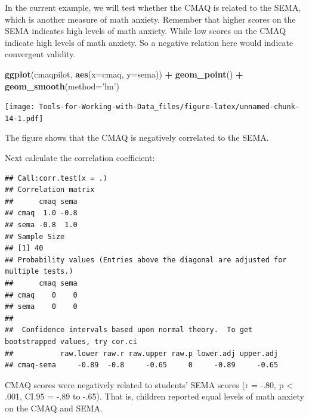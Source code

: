 \documentclass[
]{book}
\newenvironment{Shaded}{\begin{snugshade}}{\end{snugshade}}
\newcommand{\DataTypeTok}[1]{\textcolor[rgb]{0.13,0.29,0.53}{#1}}
\newcommand{\KeywordTok}[1]{\textcolor[rgb]{0.13,0.29,0.53}{\textbf{#1}}}
\newcommand{\NormalTok}[1]{#1}
\newcommand{\OperatorTok}[1]{\textcolor[rgb]{0.81,0.36,0.00}{\textbf{#1}}}
\newcommand{\OtherTok}[1]{\textcolor[rgb]{0.56,0.35,0.01}{#1}}
\newcommand{\StringTok}[1]{\textcolor[rgb]{0.31,0.60,0.02}{#1}}
\begin{document}
In the current example, we will test whether the CMAQ is related to the SEMA, which is another measure of math anxiety. Remember that higher scores on the SEMA indicates high levels of math anxiety. While low scores on the CMAQ indicate high levels of math anxiety. So a negative relation here would indicate convergent validity.

\begin{Shaded}
\begin{Highlighting}[]
\KeywordTok{ggplot}\NormalTok{(cmaqpilot, }\KeywordTok{aes}\NormalTok{(}\DataTypeTok{x=}\NormalTok{cmaq, }\DataTypeTok{y=}\NormalTok{sema)) }\OperatorTok{+}
\StringTok{  }\KeywordTok{geom_point}\NormalTok{() }\OperatorTok{+}
\StringTok{  }\KeywordTok{geom_smooth}\NormalTok{(}\DataTypeTok{method=}\StringTok{'lm'}\NormalTok{)}
\end{Highlighting}
\end{Shaded}

\texttt{[image: Tools-for-Working-with-Data\_files/figure-latex/unnamed-chunk-14-1.pdf]}

The figure shows that the CMAQ is negatively correlated to the SEMA.

Next calculate the correlation coefficient:

\begin{Shaded}
\end{Shaded}

\begin{verbatim}
## Call:corr.test(x = .)
## Correlation matrix 
##      cmaq sema
## cmaq  1.0 -0.8
## sema -0.8  1.0
## Sample Size 
## [1] 40
## Probability values (Entries above the diagonal are adjusted for multiple tests.) 
##      cmaq sema
## cmaq    0    0
## sema    0    0
## 
##  Confidence intervals based upon normal theory.  To get bootstrapped values, try cor.ci
##           raw.lower raw.r raw.upper raw.p lower.adj upper.adj
## cmaq-sema     -0.89  -0.8     -0.65     0     -0.89     -0.65
\end{verbatim}

CMAQ scores were negatively related to students' SEMA scores (r = -.80, p \textless{} .001, CI.95 = -.89 to -.65). That is, children reported equal levels of math anxiety on the CMAQ and SEMA.
\end{document}
